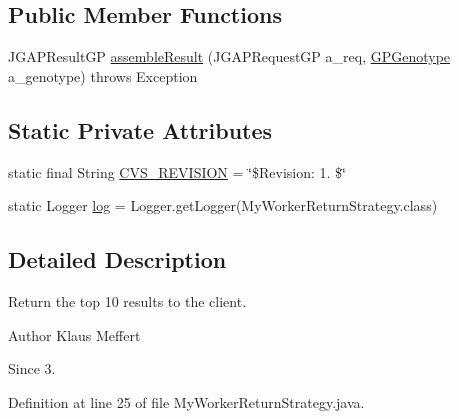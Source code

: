 \subsection*{Public Member Functions}
\begin{DoxyCompactItemize}
\item 
J\-G\-A\-P\-Result\-G\-P \hyperlink{classexamples_1_1grid_1_1math_problem_distributed_1_1_my_worker_return_strategy_ae5b7453644257ded0a6fb19f9ea23148}{assemble\-Result} (J\-G\-A\-P\-Request\-G\-P a\-\_\-req, \hyperlink{classorg_1_1jgap_1_1gp_1_1impl_1_1_g_p_genotype}{G\-P\-Genotype} a\-\_\-genotype)  throws Exception 
\end{DoxyCompactItemize}
\subsection*{Static Private Attributes}
\begin{DoxyCompactItemize}
\item 
static final String \hyperlink{classexamples_1_1grid_1_1math_problem_distributed_1_1_my_worker_return_strategy_a7583b6ee491697d2e14dd2ebeb768bc7}{C\-V\-S\-\_\-\-R\-E\-V\-I\-S\-I\-O\-N} = \char`\"{}\$Revision\-: 1. \$\char`\"{}
\item 
static Logger \hyperlink{classexamples_1_1grid_1_1math_problem_distributed_1_1_my_worker_return_strategy_a8a4095e8a1070054282995a1cfc9ff12}{log} = Logger.\-get\-Logger(My\-Worker\-Return\-Strategy.\-class)
\end{DoxyCompactItemize}


\subsection{Detailed Description}
Return the top 10 results to the client.

\begin{DoxyAuthor}{Author}
Klaus Meffert 
\end{DoxyAuthor}
\begin{DoxySince}{Since}
3. 
\end{DoxySince}


Definition at line 25 of file My\-Worker\-Return\-Strategy.\-java.



